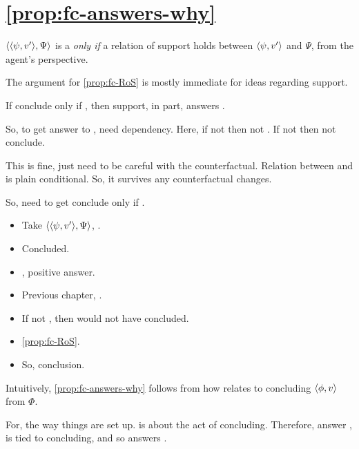 \section{\autoref{prop:fc-answers-why}}
\label{sec:simple-argument}

\begin{note}

  \begin{proposition}
    \label{prop:fc-RoS}
    \(\langle \langle \psi, v' \rangle, \Psi \rangle\) is a \fc{} \emph{only if} a relation of support holds between \(\langle \psi, v' \rangle\) and \(\Psi\), from the agent's perspective.
  \end{proposition}

  The argument for \autoref{prop:fc-RoS} is {\color{red} mostly immediate for ideas regarding support}.

  \begin{proposition}
    If conclude only if \fc{}, then support, in part, answers \qWhyV{}.
  \end{proposition}

  So, to get answer to \qWhyV{}, need dependency.
  Here, if not \support{} then not \fc{}.
  If not \fc{} then not conclude.

  This is fine, just need to be careful with the counterfactual.
  Relation between \support{} and \fc{} is plain conditional.
  So, it survives any counterfactual changes.
\end{note}

\begin{note}
  So, need to get conclude only if \fc{}.
\end{note}

\begin{note}
  \begin{itemize}
  \item Take \(\langle \langle \psi, v' \rangle, \Psi \rangle\), \requ{}.
  \item Concluded.
  \item \qzS{}, positive answer.
  \item Previous chapter, \ptivityQ{}.
  \item If not \fc{}, then would not have concluded.
  \item \autoref{prop:fc-RoS}.
  \item So, conclusion.
  \end{itemize}
\end{note}

\begin{note}
  Intuitively, \autoref{prop:fc-answers-why} follows from how \qzS{} relates to concluding \(\langle \phi, v \rangle\) from \(\Phi\).

  For, the way things are set up.
  \qzS{} is about the act of concluding.
  Therefore, answer \qzS{}, is tied to concluding, and so \support{} answers \qWhyV{}.
\end{note}

